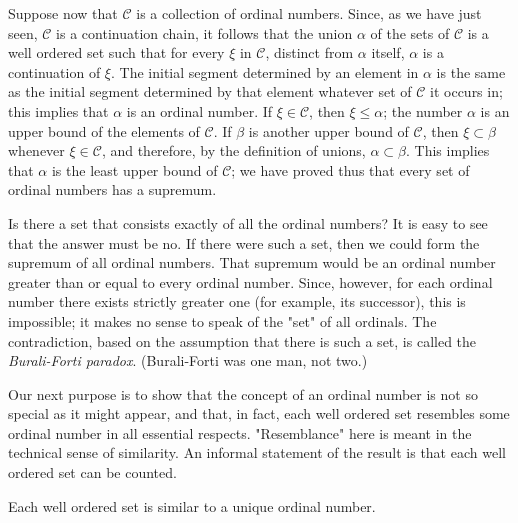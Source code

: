 Suppose now that $\mathcal{C}$ is a collection of ordinal numbers. Since, as we have just seen, $\mathcal{C}$ is a continuation chain, it follows that the union $\alpha$ of the sets of $\mathcal{C}$ is a well ordered set such that for every $\xi$ in $\mathcal{C}$, distinct from $\alpha$ itself, $\alpha$ is a continuation of $\xi$. The initial segment determined by an element in $\alpha$ is the same as the initial segment determined by that element whatever set of $\mathcal{C}$ it occurs in; this implies that $\alpha$ is an ordinal number. If $\xi \in \mathcal{C}$, then $\xi \le \alpha$; the number $\alpha$ is an upper bound of the elements of $\mathcal{C}$. If $\beta$ is another upper bound of $\mathcal{C}$, then $\xi \subset \beta$ whenever $\xi \in \mathcal{C}$, and therefore, by the definition of unions, $\alpha \subset \beta$. This implies that $\alpha$ is the least upper bound of $\mathcal{C}$; we have proved thus that every set of ordinal numbers has a supremum. 

Is there a set that consists exactly of all the ordinal numbers? It is easy to see that the answer must be no. If there were such a set, then we could form the supremum of all ordinal numbers. That supremum would be an ordinal number greater than or equal to every ordinal number. Since, however, for each  ordinal number there exists strictly greater one (for example, its successor), this is impossible; it makes no sense to speak of the "set" of all ordinals. The contradiction, based on the assumption that there is such a set, is called the \textit{Burali-Forti paradox}. (Burali-Forti was one man, not two.) 

Our next purpose is to show that the concept of an ordinal number is not so special as it might appear, and that, in fact, each well ordered set resembles some ordinal number in all essential respects. "Resemblance" here is meant in the technical sense of similarity. An informal statement of the result is that each well ordered set can be counted. 

\begin{named} Each well ordered set is similar to a unique ordinal number.
\end{named}

